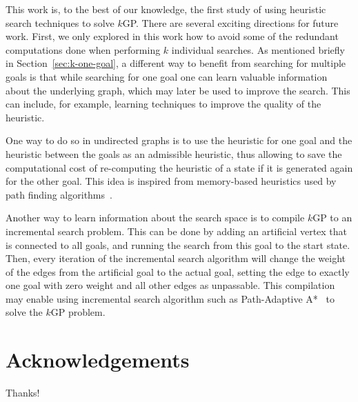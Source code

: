 \documentclass{aicom2e}
\newcommand{\kgs}{$k$GP}
\begin{document}
This work is, to the best of our knowledge, the first study of using heuristic search techniques to solve \kgs{}. There are several exciting directions for future work. First, we only explored in this work how to avoid some of the redundant computations done when performing $k$ individual searches. As mentioned briefly in Section~\ref{sec:k-one-goal}, a different way to benefit from searching for multiple goals is that while searching for one goal one can learn valuable information about the underlying graph, which may later be used to improve the search. This can include, for example, learning techniques to improve the quality of the heuristic.

One way to do so in undirected graphs is to use the heuristic for one goal and the heuristic between the goals as an admissible heuristic, thus allowing to save the computational cost of re-computing the heuristic of a state if it is generated again for the other goal. This idea is inspired from memory-based heuristics used by path finding algorithms~\cite{sturtevant2007memory,sturtevant2009memory,goldenberg2011theCompressed}.

Another way to learn information about the search space is to compile \kgs{} to an incremental search problem. This can be done by adding an artificial vertex that is connected to all goals, and running the search from this goal to the start state. Then, every iteration of the incremental search algorithm will change the weight of the edges from the artificial goal to the actual goal, setting the edge to exactly one goal with zero weight and all other edges as unpassable. This compilation may enable using incremental search algorithm such as Path-Adaptive A*~\cite{hernandez2015reusing} to solve the \kgs{} problem.






\section*{Acknowledgements}
Thanks!



\end{document}
